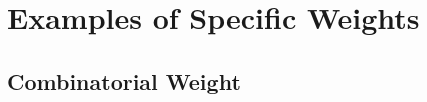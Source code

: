 \documentclass[10pt]{amsart}
\theoremstyle{definition}
\newtheorem*{remark}{Remark}
\newcommand{\F}{{F}}
\newcommand{\eat}[1]{}
\begin{document}

\eat{\begin{remark}
    When dropping the assumption that $D(Q^H_D) = D(Q^H_N),$ one can still show by similar arguments as in the proof of Theorem~\ref{spectrum1} that $$\sigma(\Delta^+_N+\Delta^-_D)\backslash\lbrace 0\rbrace \subseteq\sigma(\Delta^-_{D}) \qquad\mbox{and}\qquad \sigma(\Delta^+_{D}+\Delta^-_N)\backslash\lbrace 0\rbrace \subseteq\sigma(\Delta^+_{D})$$ when $R(\delta_D)\subseteq D(\delta_D)$ for the operators introduced in Section~\ref{Hilbert}. In fact, one can show in a very similar fashion that $$\sigma(\Delta^+_N+\Delta^-_D)\backslash\lbrace 0\rbrace = \sigma(\Delta^-_{D})\backslash\lbrace 0\rbrace$$ and under the assumption that $R(\delta_D)\subseteq D(\delta_D)$ that $$\sigma(\Delta^+_{D}+\Delta^-_N)\backslash\lbrace 0\rbrace = \sigma(\Delta^+_{D})\backslash\lbrace 0\rbrace.$$
\end{remark}

}


\section{Examples  of Specific Weights} 
\subsection{Combinatorial Weight}
\end{document}
